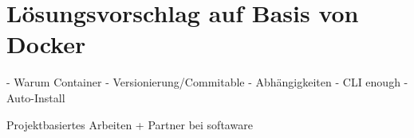 \chapter{Lösungsvorschlag auf Basis von Docker}
\label{cha:possible-solution}

- Warum Container
- Versionierung/Commitable
- Abhängigkeiten
- CLI enough
- Auto-Install


Projektbasiertes Arbeiten + Partner bei softaware
